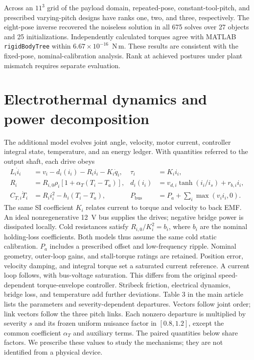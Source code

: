 \documentclass[12pt,a4paper]{article}
\begin{document}
Across an $11^3$ grid of the payload domain, repeated-pose,
constant-tool-pitch, and prescribed varying-pitch designs have ranks one,
two, and three, respectively. The eight-pose inverse recovered the noiseless
solution in all 675 solves over 27 objects and 25 initializations.
Independently calculated torques agree with MATLAB \texttt{rigidBodyTree}
within $6.67\times10^{-16}$~N\,m. These results are consistent with the
fixed-pose, nominal-calibration analysis. Rank at achieved postures under
plant mismatch requires separate evaluation.


\section{Electrothermal dynamics and power decomposition}
\label{app:cross_model}

The additional model evolves joint angle, velocity, motor current,
controller integral state, temperature, and an energy ledger. With quantities
referred to the output shaft, each drive obeys
\begin{align}
 L_i\dot i_i &= v_i-d_i(i_i)-R_i i_i-K_i\dot q_i,
 &\tau_i&=K_i i_i,\\
 R_i &= R_{i,0}\rho_i[1+\alpha_T(T_i-T_a)],
 &d_i(i_i)&=v_{d,i}\tanh(i_i/i_s)+r_{b,i}i_i,\\
 C_{T,i}\dot T_i&=R_i i_i^2-h_i(T_i-T_a),
 &P_{\mathrm{bus}}&=P_a+\sum_i\max(v_i i_i,0).
 \label{eq:electrothermal}
\end{align}
The same SI coefficient $K_i$ relates current to torque and velocity to
back EMF. An ideal nonregenerative 12~V bus supplies the drives; negative
bridge power is dissipated locally. Cold resistances satisfy
$R_{i,0}/K_i^2=b_i$, where $b_i$ are the nominal holding-loss coefficients.
Both models thus assume the same cold static calibration.
$P_a$ includes a prescribed offset and low-frequency ripple. Nominal geometry,
outer-loop gains, and stall-torque ratings are retained. Position error,
velocity damping, and integral torque set a saturated current reference.
A current loop follows, with bus-voltage saturation. This differs from the
original speed-dependent torque-envelope controller. Stribeck friction,
electrical dynamics, bridge loss, and temperature add further deviations.
Table 3 in the main article lists the parameters and severity-dependent
departures. Vectors follow joint order; link vectors follow the three pitch
links. Each nonzero departure is multiplied by severity $s$ and its frozen
uniform nuisance factor in $[0.8,1.2]$, except the common coefficient
$\alpha_T$ and auxiliary terms. The paired quantities below share factors.
We prescribe these values to study the mechanisms; they are not identified
from a physical device.
\end{document}
